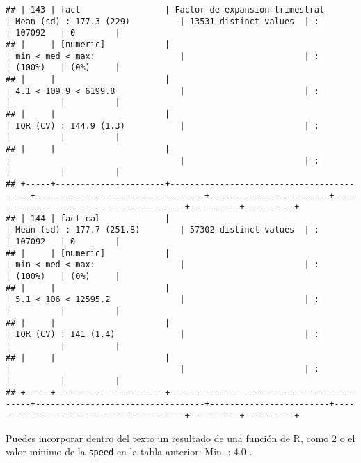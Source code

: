 \documentclass[]{article}
\begin{document}
\begin{verbatim}
## | 143 | fact                 | Factor de expansión trimestral           | Mean (sd) : 177.3 (229)          | 13531 distinct values  | :                                      | 107092   | 0        |
## |     | [numeric]            |                                          | min < med < max:                 |                        | :                                      | (100%)   | (0%)     |
## |     |                      |                                          | 4.1 < 109.9 < 6199.8             |                        | :                                      |          |          |
## |     |                      |                                          | IQR (CV) : 144.9 (1.3)           |                        | :                                      |          |          |
## |     |                      |                                          |                                  |                        | :                                      |          |          |
## +-----+----------------------+------------------------------------------+----------------------------------+------------------------+----------------------------------------+----------+----------+
## | 144 | fact_cal             |                                          | Mean (sd) : 177.7 (251.8)        | 57302 distinct values  | :                                      | 107092   | 0        |
## |     | [numeric]            |                                          | min < med < max:                 |                        | :                                      | (100%)   | (0%)     |
## |     |                      |                                          | 5.1 < 106 < 12595.2              |                        | :                                      |          |          |
## |     |                      |                                          | IQR (CV) : 141 (1.4)             |                        | :                                      |          |          |
## |     |                      |                                          |                                  |                        | :                                      |          |          |
## +-----+----------------------+------------------------------------------+----------------------------------+------------------------+----------------------------------------+----------+----------+
\end{verbatim}

Puedes incorporar dentro del texto un resultado de una función de R,
como 2 o el valor mínimo de la \texttt{speed} en la tabla anterior: Min.
: 4.0 .
\end{document}
